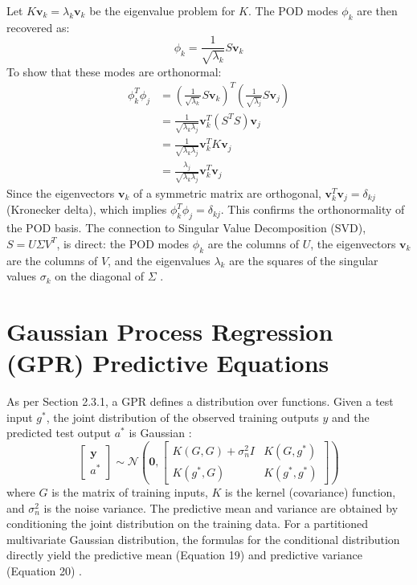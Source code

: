 \documentclass[dscexam, EN]{ufabcFHZh}
\begin{document}
Let $K\mathbf{v}_k = \lambda_k \mathbf{v}_k$ be the eigenvalue problem for $K$. The POD modes $\phi_k$ are then recovered as:
\begin{equation}
    \phi_k = \frac{1}{\sqrt{\lambda_k}} S \mathbf{v}_k
\end{equation}
To show that these modes are orthonormal:
\begin{align*}
    \phi_k^T \phi_j &= \left( \frac{1}{\sqrt{\lambda_k}} S \mathbf{v}_k \right)^T \left( \frac{1}{\sqrt{\lambda_j}} S \mathbf{v}_j \right) \\
    &= \frac{1}{\sqrt{\lambda_k \lambda_j}} \mathbf{v}_k^T (S^T S) \mathbf{v}_j \\
    &= \frac{1}{\sqrt{\lambda_k \lambda_j}} \mathbf{v}_k^T K \mathbf{v}_j \\
    &= \frac{\lambda_j}{\sqrt{\lambda_k \lambda_j}} \mathbf{v}_k^T \mathbf{v}_j
\end{align*}
Since the eigenvectors $\mathbf{v}_k$ of a symmetric matrix are orthogonal, $\mathbf{v}_k^T \mathbf{v}_j = \delta_{kj}$ (Kronecker delta), which implies $\phi_k^T \phi_j = \delta_{kj}$. This confirms the orthonormality of the POD basis. The connection to Singular Value Decomposition (SVD), $S = U\Sigma V^T$, is direct: the POD modes $\phi_k$ are the columns of $U$, the eigenvectors $\mathbf{v}_k$ are the columns of $V$, and the eigenvalues $\lambda_k$ are the squares of the singular values $\sigma_k$ on the diagonal of $\Sigma$ \cite{[1, 1]}.

\section{Gaussian Process Regression (GPR) Predictive Equations}
\label{sec:gpr_derivation}

As per Section 2.3.1, a GPR defines a distribution over functions. Given a test input $g^*$, the joint distribution of the observed training outputs $y$ and the predicted test output $a^*$ is Gaussian \cite{[1, 1]}:
\begin{equation}
    \begin{bmatrix} \mathbf{y} \\ a^* \end{bmatrix} \sim \mathcal{N} \left( \mathbf{0}, \begin{bmatrix} K(G, G) + \sigma_n^2 I & K(G, g^*) \\ K(g^*, G) & K(g^*, g^*) \end{bmatrix} \right)
\end{equation}
where $G$ is the matrix of training inputs, $K$ is the kernel (covariance) function, and $\sigma_n^2$ is the noise variance. The predictive mean and variance are obtained by conditioning the joint distribution on the training data. For a partitioned multivariate Gaussian distribution, the formulas for the conditional distribution directly yield the predictive mean (Equation 19) and predictive variance (Equation 20) \cite{[1, 1]}.
\end{document}
